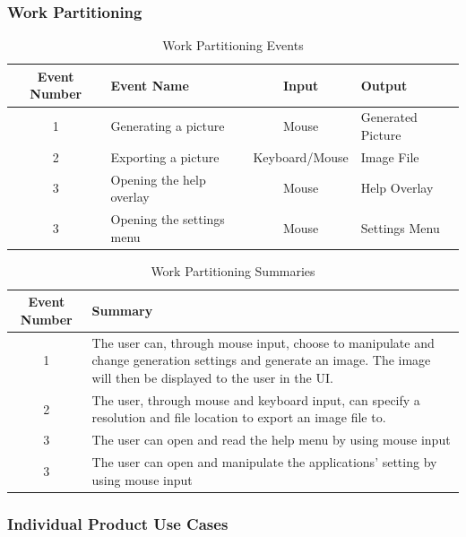 \documentclass[12pt, titlepage]{article}
\begin{document}
\subsubsection{Work Partitioning}

\begin{table}[H]
    \centering
    \begin{tabular}{|c|l|c|l|} \hline
        \textbf{Event Number} & \textbf{Event Name} & \textbf{Input} & \textbf{Output} \\ \hline
        1 & Generating a picture & Mouse & Generated Picture \\ \hline
        2 & Exporting a picture & Keyboard/Mouse & Image File \\ \hline
        3 & Opening the help overlay & Mouse & Help Overlay \\ \hline
        3 & Opening the settings menu & Mouse & Settings Menu \\ \hline
    \end{tabular}
    \caption{Work Partitioning Events}
    \label{tab:WorkPart1}
\end{table}

\begin{table}[H]
    \centering
    \begin{tabular}{|c|p{120mm}|} \hline
        \textbf{Event Number} & \textbf{Summary} \\ \hline
        1 & The user can, through mouse input, choose to manipulate and change generation settings and generate an image. The image will then be displayed to the user in the UI. \\ \hline
        2 & The user, through mouse and keyboard input, can specify a resolution and file location to export an image file to. \\ \hline
        3 & The user can open and read the help menu by using mouse input \\ \hline
        3 & The user can open and manipulate the applications' setting by using mouse input \\ \hline
    \end{tabular}
    \caption{Work Partitioning Summaries}
    \label{tab:WorkPart2}
\end{table}

\subsubsection{Individual Product Use Cases}
\end{document}
